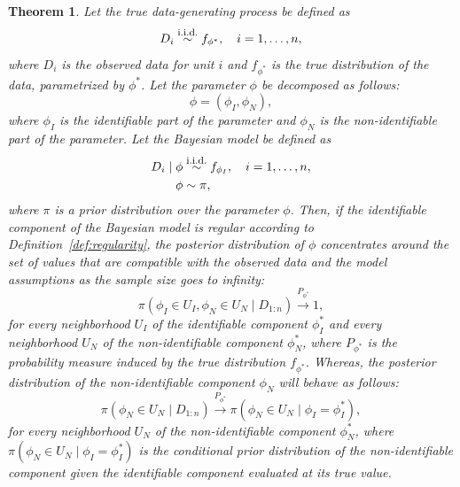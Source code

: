 \documentclass[12pt]{article}
\newtheorem{theorem}{Theorem}
\newcommand{\iid}{\overset{\text{\footnotesize i.i.d.}}{\sim}}
\begin{document}
\begin{theorem}
  Let the true data-generating process be defined as
  \begin{equation}
    D_{i} \iid f_{\phi^{*}}, \quad i = 1, \ldots, n,
  \end{equation}
  where \(D_{i}\) is the observed data for unit \(i\) and \(f_{\phi^{*}}\) is the true distribution of the data, parametrized by \(\phi^{*}\). Let the parameter \(\phi\) be decomposed as follows:
  \begin{equation}
    \phi = (\phi_{I}, \phi_{N}),
  \end{equation}
  where \(\phi_{I}\) is the identifiable part of the parameter and \(\phi_{N}\) is the non-identifiable part of the parameter. Let the Bayesian model be defined as
  \begin{align}
    \begin{split}
      D_{i} \mid \phi & \iid f_{\phi_{I}}, \quad i = 1, \ldots, n, \\
      \phi & \sim \pi,
    \end{split}
  \end{align}
  where \(\pi\) is a prior distribution over the parameter \(\phi\). Then, if the identifiable component of the Bayesian model is regular according to Definition~\ref{def:regularity}, the posterior distribution of \(\phi\) concentrates around the set of values that are compatible with the observed data and the model assumptions as the sample size goes to infinity:
  \begin{equation}
    \pi \left( \phi_{I} \in U_{I}, \phi_{N} \in U_{N} \mid D_{1:n} \right) \overset{P_{\phi^{*}}}{\to} 1,
  \end{equation}
  for every neighborhood \(U_{I}\) of the identifiable component \(\phi_{I}^{*}\) and every neighborhood \(U_{N}\) of the non-identifiable component \(\phi_{N}^{*}\), where \(P_{\phi^{*}}\) is the probability measure induced by the true distribution \(f_{\phi^{*}}\). Whereas, the posterior distribution of the non-identifiable component \(\phi_{N}\) will behave as follows:
  \begin{equation}
    \pi \left( \phi_{N} \in U_{N} \mid D_{1:n} \right) \overset{P_{\phi^{*}}}{\to} \pi \left( \phi_{N} \in U_{N} \mid \phi_{I} = \phi_{I}^{*} \right),
  \end{equation}
  for every neighborhood \(U_{N}\) of the non-identifiable component \(\phi_{N}^{*}\), where \(\pi \left( \phi_{N} \in U_{N} \mid \phi_{I} = \phi_{I}^{*} \right)\) is the conditional prior distribution of the non-identifiable component given the identifiable component evaluated at its true value.
\end{theorem}
\end{document}

